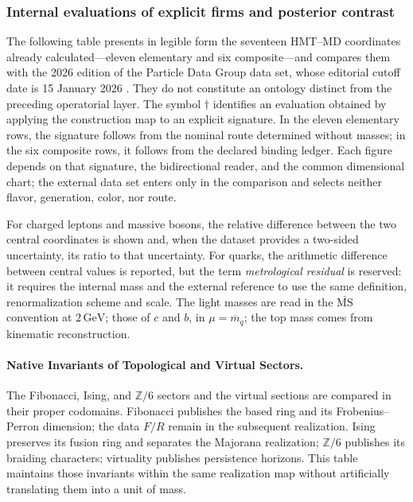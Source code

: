
\subsubsection{Internal evaluations of explicit firms and posterior contrast}

The following table presents in legible form the seventeen HMT--MD coordinates already calculated---eleven elementary and six composite---and compares them with the 2026 edition of the Particle Data Group data set, whose editorial cutoff date is 15 January 2026 \cite{PDG2026}. They do not constitute an ontology distinct from the preceding operatorial layer. The symbol \(\dagger\) identifies an evaluation obtained by applying the construction map to an explicit signature. In the eleven elementary rows, the signature follows from the nominal route determined without masses; in the six composite rows, it follows from the declared binding ledger. Each figure depends on that signature, the bidirectional reader, and the common dimensional chart; the external data set enters only in the comparison and selects neither flavor, generation, color, nor route.


For charged leptons and massive bosons, the relative difference between
the two central coordinates is shown and, when the dataset provides a two-sided
uncertainty, its ratio to that uncertainty. For quarks, the
arithmetic difference between central values is reported, but the term
\emph{metrological residual} is reserved: it requires the internal mass and the external reference
to use the same definition, renormalization scheme and scale.
The light masses are read in the \(\overline{\mathrm{MS}}\) convention at
\(2\,\mathrm{GeV}\); those of \(c\) and \(b\), in
\(\mu=\overline m_q\); the top mass comes from kinematic reconstruction.



\paragraph{Native Invariants of Topological and Virtual Sectors.}
The Fibonacci, Ising, and \(\mathbb Z/6\) sectors and the virtual sections are compared in their proper codomains. Fibonacci publishes the based ring and its Frobenius--Perron dimension; the data \(F/R\) remain in the subsequent realization. Ising preserves its fusion ring and separates the Majorana realization; \(\mathbb Z/6\) publishes its braiding characters; virtuality publishes persistence horizons. This table maintains those invariants within the same realization map without artificially translating them into a unit of mass.

